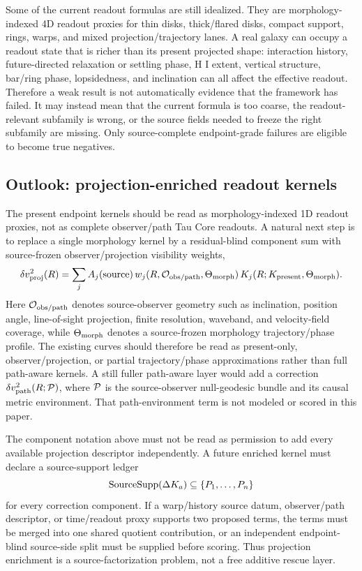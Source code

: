 \documentclass[11pt]{article}
\begin{document}
Some of the current readout formulas are still idealized.  They are
morphology-indexed 4D readout proxies for thin disks, thick/flared disks,
compact support, rings, warps, and mixed projection/trajectory lanes.  A real
galaxy can occupy a readout state that is richer than its present projected
shape: interaction history, future-directed relaxation or settling phase, H I
extent, vertical structure, bar/ring phase, lopsidedness, and inclination can
all affect the effective readout.
Therefore a weak result is not automatically evidence that the framework has
failed.  It may instead mean that the current formula is too coarse, the
readout-relevant subfamily is wrong, or the source fields needed to freeze the
right subfamily are missing.  Only source-complete endpoint-grade failures are
eligible to become true negatives.

\subsection{Outlook: projection-enriched readout kernels}

The present endpoint kernels should be read as morphology-indexed 1D readout
proxies, not as complete observer/path Tau Core readouts.  A natural next step
is to replace a single morphology kernel by a residual-blind component sum with
source-frozen observer/projection visibility weights,
\[
\delta v^2_{\rm proj}(R)
=
\sum_j
A_j({\rm source})\,
w_j(R,{\cal O}_{\rm obs/path},\Theta_{\rm morph})\,
K_j(R;K_{\rm present},\Theta_{\rm morph}) .
\]
Here \({\cal O}_{\rm obs/path}\) denotes source-observer geometry such as
inclination, position angle, line-of-sight projection, finite resolution,
waveband, and velocity-field coverage, while \(\Theta_{\rm morph}\) denotes a
source-frozen morphology trajectory/phase profile.  The existing curves should
therefore be read as present-only, observer/projection, or partial
trajectory/phase approximations rather than full path-aware kernels.  A still
fuller path-aware layer would add a
correction \(\delta v^2_{\rm path}(R;{\cal P})\), where \({\cal P}\) is the
source-observer null-geodesic bundle and its causal metric environment.  That
path-environment term is not modeled or scored in this paper.

The component notation above must not be read as permission to add every
available projection descriptor independently.  A future enriched kernel must
declare a source-support ledger
\[
{\rm SourceSupp}(\Delta K_a)\subseteq \{P_1,\ldots,P_n\}
\]
for every correction component.  If a warp/history source datum,
observer/path descriptor, or time/readout proxy supports two proposed terms,
the terms must be merged into one shared quotient contribution, or an
independent endpoint-blind source-side split must be supplied before scoring.
Thus projection enrichment is a source-factorization problem, not a free
additive rescue layer.
\end{document}
